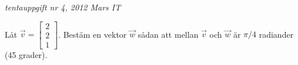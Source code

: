 {\it tentauppgift nr 4, 2012 Mars IT}

Låt $\vec{v}=\begin{bmatrix}2\\2\\1\end{bmatrix}$. Bestäm en vektor $\vec{w}$ sådan att mellan $\vec{v}$ och $\vec{w}$ är $\pi/4$ radiander (45 grader).